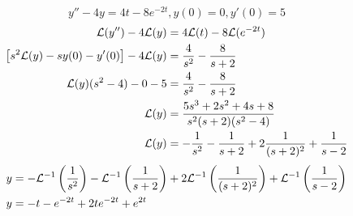 \documentclass{article}
\begin{document}
\begin{enumerate}[label = \textbf{\arabic*)}]
		\begin{equation*}
			y'' - 4y = 4t - 8e^{-2t}, y(0) = 0, y'(0) = 5
		\end{equation*}
		\begin{align*}
			\mathcal{L}(y'') - 4\mathcal{L}(y) & = 4\mathcal{L}(t) - 8\mathcal{L}(e^{-2t}) \\
			\left[ s^2\mathcal{L}(y) - sy(0) - y'(0) \right] - 4\mathcal{L}(y) & = \frac{4}{s^2} - \frac{8}{s + 2} \\
			\mathcal{L}(y)(s^2 - 4) - 0 - 5 & = \frac{4}{s^2} - \frac{8}{s + 2} \\
			\mathcal{L}(y) & = \frac{5s^3 + 2s^2 + 4s + 8}{s^2(s + 2)(s^2 - 4)} \\
			\mathcal{L}(y) & = -\frac{1}{s^2} - \frac{1}{s + 2} + 2\frac{1}{(s + 2)^2} + \frac{1}{s - 2}
		\end{align*}
		\begin{align*}
			y & = -\mathcal{L}^{-1} \left( \frac{1}{s^2} \right) - \mathcal{L}^{-1} \left( \frac{1}{s + 2} \right) + 2\mathcal{L}^{-1} \left( \frac{1}{(s + 2)^2} \right) + \mathcal{L}^{-1} \left( \frac{1}{s - 2} \right) \\
			y & = -t - e^{-2t} + 2te^{-2t} + e^{2t}
		\end{align*}
\end{enumerate}
\end{document}
